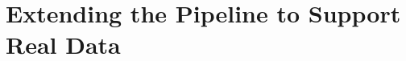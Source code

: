 \section{Extending the Pipeline to Support Real Data} \label{sec:extending-real-data}

\begin{comment}
Premise: Have a working pipeline to collect, train and render novel views from CARLA
Question: How can this pipeline be extended to enable input of real data?

\begin{itemize}
    \item How to collect images and camera poses from the car?
    \item Which changes had to be done to the pipeline to support this change?
\end{itemize}
\end{comment}

%

